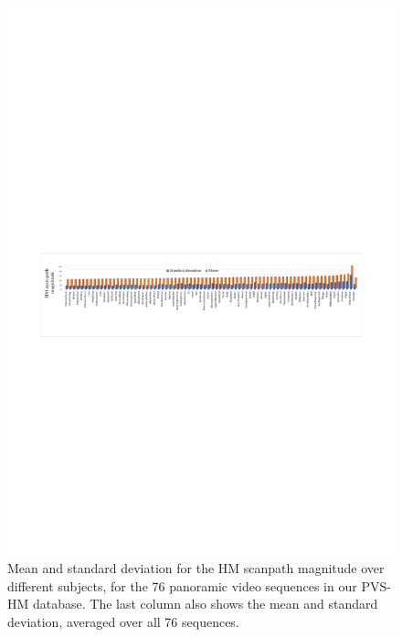 \documentclass[10pt,journal,compsoc]{IEEEtran}
\begin{document}
\begin{figure}
\vspace{-1em}
	\begin{center}
		\centerline{\includegraphics[width=2\columnwidth]{figures/database/consistence-magnitude}}
        \vspace{-1em}
		\caption{\footnotesize{Mean and standard deviation for the HM scanpath magnitude over different subjects, for the 76 panoramic video sequences in our PVS-HM database. The last column also shows the mean and standard deviation, averaged over all 76 sequences. }}
		\label{consistence-magnitude}
	\end{center}
\end{figure}
\end{document}

